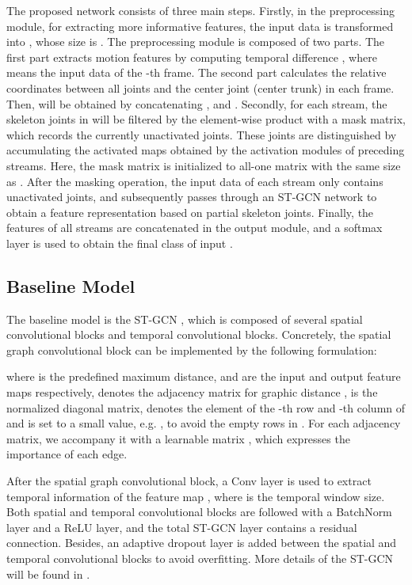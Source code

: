 \documentclass{article}
\begin{document}
The proposed network consists of three main steps. Firstly, in the preprocessing module, for extracting more informative features, the input data  is transformed into , whose size is . The preprocessing module is composed of two parts. The first part extracts motion features by computing temporal difference , where  means the input data of the -th frame. The second part calculates the relative coordinates  between all joints and the center joint (center trunk) in each frame. Then,  will be obtained by concatenating ,  and . Secondly, for each stream, the skeleton joints in  will be filtered by the element-wise product with a mask matrix, which records the currently unactivated joints. These joints are distinguished by accumulating the activated maps obtained by the activation modules of preceding streams. Here, the mask matrix is initialized to all-one matrix with the same size as . After the masking operation, the input data of each stream only contains unactivated joints, and subsequently passes through an ST-GCN network \cite{Yan2018} to obtain a feature representation based on partial skeleton joints. Finally, the features of all streams are concatenated in the output module, and a softmax layer is used to obtain the final class of input .

\subsection{Baseline Model}
\label{ssec:baseline}

The baseline model is the ST-GCN \cite{Yan2018}, which is composed of several spatial convolutional blocks and temporal convolutional blocks. Concretely, the spatial graph convolutional block can be implemented by the following formulation:

where  is the predefined maximum distance,  and  are the input and output feature maps respectively,  denotes the adjacency matrix for graphic distance ,  is the normalized diagonal matrix,  denotes the element of the -th row and -th column of  and  is set to a small value, e.g. , to avoid the empty rows in . For each adjacency matrix, we accompany it with a learnable matrix , which expresses the importance of each edge.

After the spatial graph convolutional block, a  Conv layer is used to extract temporal information of the feature map , where  is the temporal window size. Both spatial and temporal convolutional blocks are followed with a BatchNorm layer and a ReLU layer, and the total ST-GCN layer contains a residual connection. Besides, an adaptive dropout layer is added between the spatial and temporal convolutional blocks to avoid overfitting. More details of the ST-GCN will be found in \cite{Yan2018}.
\end{document}
